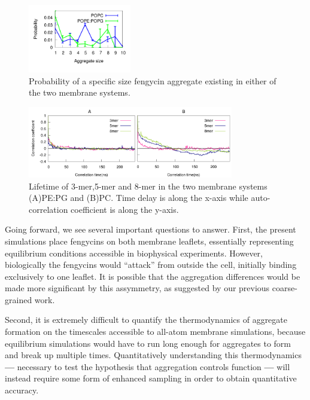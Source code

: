 \begin{figure}
\centering
\includegraphics[width=0.4\textwidth]{chapter2_figs/clusters.pdf}
\caption{\label{fig:ch2_cluster_pop} Probability of a specific size fengycin aggregate existing in either of the two membrane systems.}
\end{figure}

\begin{figure}
\centering
\includegraphics[width=0.8\textwidth]{chapter2_figs/aggs_lipidtype.pdf}
\caption{\label{fig:ch2_membrane_lifetime} Lifetime of 3-mer,5-mer and 8-mer in the two membrane systems (A)PE:PG and (B)PC.
Time delay is along the x-axis while auto-correlation coefficient is along the y-axis.
}
\end{figure}

Going forward, we see several important questions to answer. First, the present
simulations place fengycins on both membrane leaflets, essentially representing
equilibrium conditions accessible in biophysical experiments. However, biologically the
fengycins would ``attack'' from outside the cell, initially binding exclusively to one
leaflet. It is possible that the aggregation differences would be made more
significant by this assymmetry, as suggested by our previous coarse-grained work.\cite{HornGrossfield2013}

Second, it is extremely difficult to quantify the thermodynamics of aggregate
formation on the timescales accessible to all-atom membrane simulations, because
equilibrium simulations would have to run long enough for aggregates to form and
break up multiple times. Quantitatively understanding this thermodynamics \textbf{---}
necessary to test the hypothesis that aggregation controls function \textbf{---} will instead
require some form of enhanced sampling in order to obtain quantitative accuracy.

